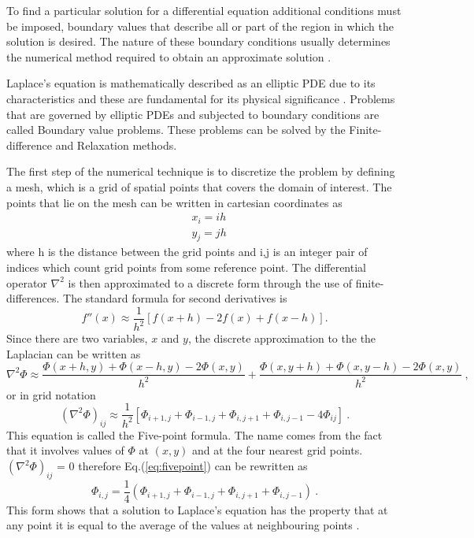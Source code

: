 \documentclass[a4paper]{jpconf}
\begin{document}
To find a particular solution for a differential equation additional conditions must be imposed, boundary values that describe all or part of the region in which the solution is desired. The nature of these boundary conditions usually determines the numerical method required to obtain an approximate solution \cite{Cheney.Kincai-NumericalMethods}. \par
Laplace's equation is mathematically described as an elliptic PDE due to its characteristics and these are fundamental for its physical significance \cite{RHB-MathematicalMethods}. Problems that are governed by elliptic PDEs and subjected to boundary conditions are called Boundary value problems.
These problems can be solved by the Finite-difference and Relaxation methods. \par

The first step of the numerical technique is to discretize the problem by defining a mesh, which is a grid of  spatial points that covers the domain of interest. The points that lie on the mesh can be written in cartesian coordinates as 
\begin{subequations}
\begin{align}
&x_i = ih\\ 
&y_j = jh
\end{align}
\label{eq:coord}
\end{subequations} 
\noindent where h is the distance between the grid points and i,j is an integer pair of indices which count grid points from some reference point. The differential operator $\nabla^2$ is then approximated 
to a discrete form through the use of finite-differences. The standard formula for second derivatives is 
\begin{equation}
f''(x) \approx \frac{1}{h^2}[f(x+h) - 2f(x) + f(x-h)].
\end{equation}
\noindent Since there are two variables, $x$ and $y$, the discrete approximation to the the Laplacian can be written as
\begin{equation}
\nabla^2 \Phi \approx \frac{\Phi(x+h,y) + \Phi(x-h,y) - 2\Phi(x,y)}{h^2} + \frac{\Phi(x,y+h) + \Phi(x,y-h) - 2\Phi(x,y)}{h^2}~,
\end{equation}
\noindent or in grid notation
\begin{equation}
(\nabla^2 \Phi)_{ij} \approx \frac{1}{h^2}[\Phi_{i+1,j} + \Phi_{i-1,j} + \Phi_{i,j+1} + \Phi_{i,j-1} - 4\Phi_{ij}]~.
\label{eq:fivepoint}
\end{equation}
This equation is called the Five-point formula. The name comes from the fact that it involves values of $\Phi$ at $(x,y)$ and at the four nearest grid points. $(\nabla^2 \Phi)_{ij}$ = 0 therefore Eq.(\ref{eq:fivepoint}) can be rewritten as 
\begin{equation}
\Phi_{i,j} = \frac{1}{4}(\Phi_{i+1,j} + \Phi_{i-1,j} + \Phi_{i,j+1} + \Phi_{i,j-1})~.
\end{equation}
\noindent This form shows that a solution to Laplace's equation has the property that at any point it is equal to the average of the values at neighbouring points \cite{Cheney.Kincai-NumericalMethods}. 
\end{document}
